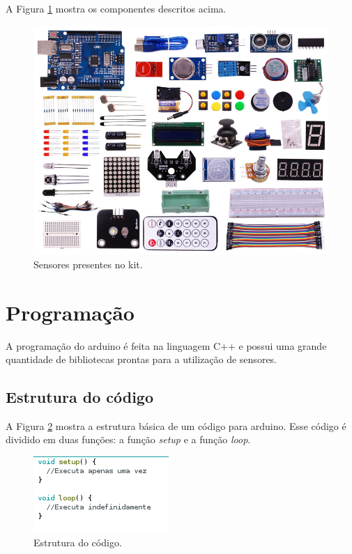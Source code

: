 \documentclass[12pt]{article}
\begin{document}
	A Figura \ref{figComponentes} mostra os componentes descritos acima.

	\begin{figure}[H]
		\centering
		\includegraphics[scale=0.25]{Imagens/kit.png}
		\caption{Sensores presentes no kit.}
		\label{figComponentes}
	\end{figure}

\section{Programação}
	A programação do arduino é feita na linguagem C++ e possui uma grande quantidade de bibliotecas prontas para a utilização de sensores.

\subsection{Estrutura do código}
	A Figura \ref{figEstruturaCodigo} mostra a estrutura básica de um código para arduino. Esse código é dividido em duas funções: a função \textit{setup} e a função \textit{loop}.

	\begin{figure}[H]
		\centering
		\includegraphics[scale=1]{Imagens/figEstrutura.png}
		\caption{Estrutura do código.}
		\label{figEstruturaCodigo}
	\end{figure}
\end{document}
